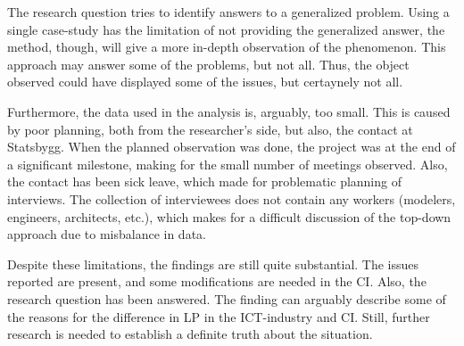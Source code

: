 The research question tries to identify answers to a generalized problem. Using a single case-study has the limitation of not providing the generalized answer, the method, though, will give a more in-depth observation of the phenomenon. This approach may answer some of the problems, but not all. Thus, the object observed could have displayed some of the issues, but certaynely not all.

Furthermore, the data used in the analysis is, arguably, too small. This is caused by poor planning, both from the researcher's side, but also, the contact at Statsbygg. When the planned observation was done, the project was at the end of a significant milestone, making for the small number of meetings observed. Also, the contact has been sick leave, which made for problematic planning of interviews. The collection of interviewees does not contain any workers (modelers, engineers, architects, etc.), which makes for a difficult discussion of the top-down approach due to misbalance in data.

Despite these limitations, the findings are still quite substantial. The issues reported are present, and some modifications are needed in the CI. Also, the research question has been answered. The finding can arguably describe some of the reasons for the difference in LP in the ICT-industry and CI. Still, further research is needed to establish a definite truth about the situation.


\cleardoublepage